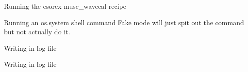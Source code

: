 \documentclass[letterpaper,10pt,english]{sphinxmanual}
\begin{document}
\begin{fulllineitems}
\begin{fulllineitems}
\label{\detokenize{api/pymusepipe:pymusepipe.recipes_pipe.PipeRecipes.recipe_wave}}
\pysigstartsignatures
{}
\pysigstopsignatures
\sphinxAtStartPar
Running the esorex muse\_wavecal recipe

\end{fulllineitems}


\begin{fulllineitems}
\label{\detokenize{api/pymusepipe:pymusepipe.recipes_pipe.PipeRecipes.run_oscommand}}
\pysigstartsignatures
{}
\pysigstopsignatures
\sphinxAtStartPar
Running an os.system shell command
Fake mode will just spit out the command but not actually do it.

\end{fulllineitems}


\begin{fulllineitems}
\label{\detokenize{api/pymusepipe:pymusepipe.recipes_pipe.PipeRecipes.write_errlogfile}}
\pysigstartsignatures
{}
\pysigstopsignatures
\sphinxAtStartPar
Writing in log file

\end{fulllineitems}


\begin{fulllineitems}
\label{\detokenize{api/pymusepipe:pymusepipe.recipes_pipe.PipeRecipes.write_logfile}}
\pysigstartsignatures
{}
\pysigstopsignatures
\sphinxAtStartPar
Writing in log file


\end{fulllineitems}
\end{fulllineitems}
\end{document}
